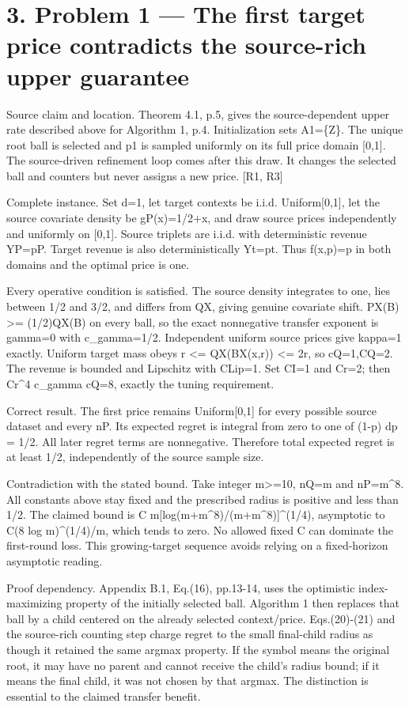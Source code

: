 \documentclass[10pt]{article}
\begin{document}
\section*{3. Problem 1 — The first target price contradicts the source-rich upper guarantee}
Source claim and location. Theorem 4.1, p.5, gives the source-dependent upper rate described above for Algorithm 1, p.4. Initialization sets A1=\{Z\}. The unique root ball is selected and p1 is sampled uniformly on its full price domain [0,1]. The source-driven refinement loop comes after this draw. It changes the selected ball and counters but never assigns a new price. [R1, R3]\par
Complete instance. Set d=1, let target contexts be i.i.d. Uniform[0,1], let the source covariate density be gP(x)=1/2+x, and draw source prices independently and uniformly on [0,1]. Source triplets are i.i.d. with deterministic revenue YP=pP. Target revenue is also deterministically Yt=pt. Thus f(x,p)=p in both domains and the optimal price is one.\par
Every operative condition is satisfied. The source density integrates to one, lies between 1/2 and 3/2, and differs from QX, giving genuine covariate shift. PX(B) >= (1/2)QX(B) on every ball, so the exact nonnegative transfer exponent is gamma=0 with c\_gamma=1/2. Independent uniform source prices give kappa=1 exactly. Uniform target mass obeys r <= QX(BX(x,r)) <= 2r, so cQ=1,CQ=2. The revenue is bounded and Lipschitz with CLip=1. Set CI=1 and Cr=2; then Cr\textasciicircum{}4 c\_gamma cQ=8, exactly the tuning requirement.\par
Correct result. The first price remains Uniform[0,1] for every possible source dataset and every nP. Its expected regret is integral from zero to one of (1-p) dp = 1/2. All later regret terms are nonnegative. Therefore total expected regret is at least 1/2, independently of the source sample size.\par
Contradiction with the stated bound. Take integer m>=10, nQ=m and nP=m\textasciicircum{}8. All constants above stay fixed and the prescribed radius is positive and less than 1/2. The claimed bound is C m[log(m+m\textasciicircum{}8)/(m+m\textasciicircum{}8)]\textasciicircum{}(1/4), asymptotic to C(8 log m)\textasciicircum{}(1/4)/m, which tends to zero. No allowed fixed C can dominate the first-round loss. This growing-target sequence avoids relying on a fixed-horizon asymptotic reading.\par
Proof dependency. Appendix B.1, Eq.(16), pp.13-14, uses the optimistic index-maximizing property of the initially selected ball. Algorithm 1 then replaces that ball by a child centered on the already selected context/price. Eqs.(20)-(21) and the source-rich counting step charge regret to the small final-child radius as though it retained the same argmax property. If the symbol means the original root, it may have no parent and cannot receive the child’s radius bound; if it means the final child, it was not chosen by that argmax. The distinction is essential to the claimed transfer benefit.\par
\end{document}
